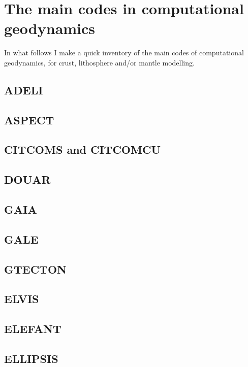 \documentclass[a4paper]{article}
\begin{document}
\appendix

\newpage
\section{The main codes in computational geodynamics}

In what follows I make a quick inventory of the main codes of computational geodynamics, 
for crust, lithosphere and/or mantle modelling.

\subsection{ADELI}

\subsection{ASPECT}

\subsection{CITCOMS and CITCOMCU}

\subsection{DOUAR}

\subsection{GAIA}

\subsection{GALE}

\subsection{GTECTON}

\subsection{ELVIS}

\subsection{ELEFANT}

\subsection{ELLIPSIS}
\end{document}

